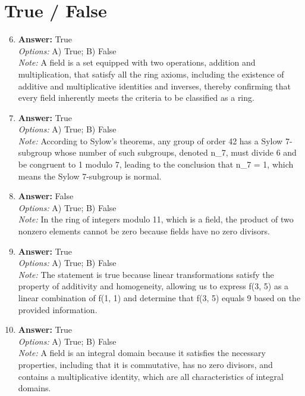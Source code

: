 \documentclass[12pt]{article}
\begin{document}
\section*{True / False}
\begin{enumerate}[label=\arabic*.]
\setcounter{enumi}{5}
\item \textbf{Answer:} True
\\ \textit{Options:} A) True; B) False
\\ \textit{Note:} A field is a set equipped with two operations, addition and multiplication, that satisfy all the ring axioms, including the existence of additive and multiplicative identities and inverses, thereby confirming that every field inherently meets the criteria to be classified as a ring.
\item \textbf{Answer:} True
\\ \textit{Options:} A) True; B) False
\\ \textit{Note:} According to Sylow's theorems, any group of order 42 has a Sylow 7-subgroup whose number of such subgroups, denoted n\_7, must divide 6 and be congruent to 1 modulo 7, leading to the conclusion that n\_7 = 1, which means the Sylow 7-subgroup is normal.
\item \textbf{Answer:} False
\\ \textit{Options:} A) True; B) False
\\ \textit{Note:} In the ring of integers modulo 11, which is a field, the product of two nonzero elements cannot be zero because fields have no zero divisors.
\item \textbf{Answer:} True
\\ \textit{Options:} A) True; B) False
\\ \textit{Note:} The statement is true because linear transformations satisfy the property of additivity and homogeneity, allowing us to express f(3, 5) as a linear combination of f(1, 1) and determine that f(3, 5) equals 9 based on the provided information.
\item \textbf{Answer:} True
\\ \textit{Options:} A) True; B) False
\\ \textit{Note:} A field is an integral domain because it satisfies the necessary properties, including that it is commutative, has no zero divisors, and contains a multiplicative identity, which are all characteristics of integral domains.
\end{enumerate}
\end{document}
